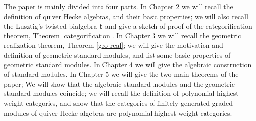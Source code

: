 The paper is mainly divided into four parts. In Chapter 2 we will
recall the definition of quiver Hecke algebras, and their basic properties;
we will also recall the Lusztig's twisted bialgebra $\mathbf{f}$ and give a
sketch of proof of the categorification theorem, Theorem
\ref{categorification}. 
In Chapter 3 we will recall 
the geometric realization theorem, Theorem \ref{geo-real};
we will give the motivation and definition of geometric standard modules,
and list some basic properties of geometric standard modules.
In Chapter 4 we will give the algebraic 
construction of standard modules. 
In Chapter 5 we will give the two main theorems of the paper;
We will show that the algebraic standard modules
and the geometric standard modules coincide;
we will recall the definition of polynomial highest weight categories,
and show that the categories of finitely generated graded modules of quiver Hecke algebras
are polynomial highest weight categories.

